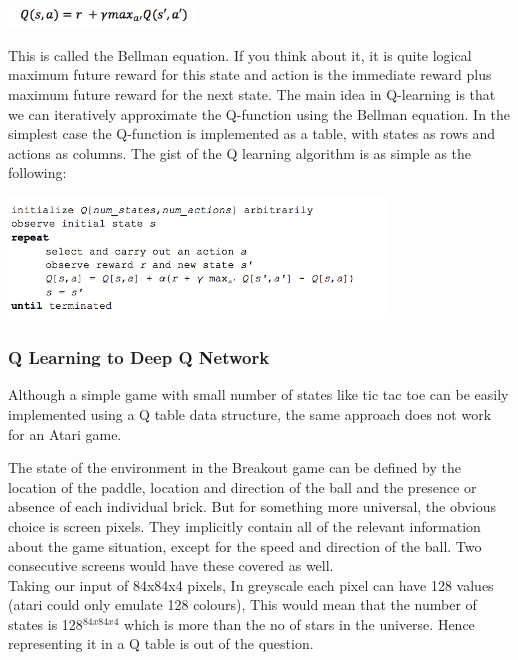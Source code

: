 \documentclass[a4paper,11pt]{article}
\begin{document}
				\begin{centering}
				\includegraphics[width=5cm]{../Design/images/q3.png}\\
				\end{centering}

				This is called the Bellman equation. If you think about it, it is quite logical maximum future reward for this state and action is the immediate reward plus maximum future reward for the next state.
				The main idea in Q-learning is that we can iteratively approximate the Q-function using the Bellman equation. In the simplest case the Q-function is implemented as a table, with states as rows and actions as columns. The gist of the Q learning algorithm is as simple as the following:

				\begin{centering}
				\includegraphics[width=10cm]{../Design/images/q4.png}\\
				\end{centering}
			\subsubsection{Q Learning to Deep Q Network}
				Although a simple game with small number of states like tic tac toe can be easily implemented using a Q table data structure, the same approach does not work for an Atari game.

				The state of the environment in the Breakout game can be defined by the location of the paddle, location and direction of the ball and the presence or absence of each individual brick. But for something more universal, the obvious choice is screen pixels. They implicitly contain all of the relevant information about the game situation, except for the speed and direction of the ball. Two consecutive screens would have these covered as well.\\

				Taking our input of 84x84x4 pixels, In greyscale each pixel can have 128 values (atari could only emulate 128 colours), This would mean that the number of states is 128$^{84x84x4}$ which is more than the no of stars in the universe. Hence representing it in a Q table is out of the question.
\end{document}
